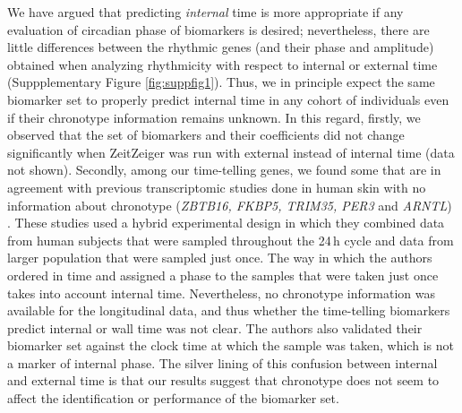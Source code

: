 We have argued that predicting \textit{internal} time is more appropriate if any evaluation of circadian phase of biomarkers is desired; nevertheless, there are little differences between the rhythmic genes (and their phase and amplitude) obtained when analyzing rhythmicity with respect to internal or external time (Suppplementary Figure \ref{fig:suppfig1}). Thus, we in principle expect the same biomarker set to properly predict internal time in any cohort of individuals even if their chronotype information remains unknown. In this regard, firstly, we observed that the set of biomarkers and their coefficients did not change significantly when ZeitZeiger was run with external instead of internal time (data not shown). Secondly, among our time-telling genes, we found some that are in agreement with previous transcriptomic studies done in human skin with no information about chronotype (\textit{ZBTB16, FKBP5, TRIM35, PER3} and \textit{ARNTL}) \cite{Wu2018, Wu2020}. These studies used a hybrid experimental design in which they combined data from human subjects that were sampled throughout the 24\,h cycle and data from larger population that were sampled just once. The way in which the authors ordered in time and assigned a phase to the samples that were taken just once takes into account internal time. Nevertheless, no chronotype information was available for the longitudinal data, and thus whether the time-telling biomarkers predict internal or wall time was not clear. The authors also validated their biomarker set against the clock time at which the sample was taken, which is not a marker of internal phase. The silver lining of this confusion between internal and external time is that our results suggest that chronotype does not seem to affect the identification or performance of the biomarker set. \\

